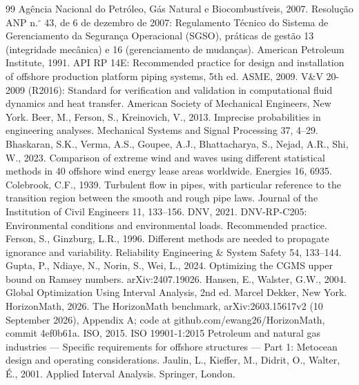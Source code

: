 \documentclass[preprint,11pt,authoryear]{elsarticle}
\begin{document}
\begin{thebibliography}{99}
 Ag\^encia Nacional do Petr\'oleo, G\'as Natural e Biocombust\'iveis, 2007. Resolu\c{c}\~ao ANP n.$^{\circ}$ 43, de 6 de dezembro de 2007: Regulamento T\'ecnico do Sistema de Gerenciamento da Seguran\c{c}a Operacional (SGSO), pr\'aticas de gest\~ao 13 (integridade mec\^anica) e 16 (gerenciamento de mudan\c{c}as).
 American Petroleum Institute, 1991. API RP 14E: Recommended practice for design and installation of offshore production platform piping systems, 5th ed.
 ASME, 2009. V\&V 20-2009 (R2016): Standard for verification and validation in computational fluid dynamics and heat transfer. American Society of Mechanical Engineers, New York.
 Beer, M., Ferson, S., Kreinovich, V., 2013. Imprecise probabilities in engineering analyses. Mechanical Systems and Signal Processing 37, 4--29.
 Bhaskaran, S.K., Verma, A.S., Goupee, A.J., Bhattacharya, S., Nejad, A.R., Shi, W., 2023. Comparison of extreme wind and waves using different statistical methods in 40 offshore wind energy lease areas worldwide. Energies 16, 6935.
 Colebrook, C.F., 1939. Turbulent flow in pipes, with particular reference to the transition region between the smooth and rough pipe laws. Journal of the Institution of Civil Engineers 11, 133--156.
 DNV, 2021. DNV-RP-C205: Environmental conditions and environmental loads. Recommended practice.
 Ferson, S., Ginzburg, L.R., 1996. Different methods are needed to propagate ignorance and variability. Reliability Engineering \& System Safety 54, 133--144.
 Gupta, P., Ndiaye, N., Norin, S., Wei, L., 2024. Optimizing the CGMS upper bound on Ramsey numbers. arXiv:2407.19026.
 Hansen, E., Walster, G.W., 2004. Global Optimization Using Interval Analysis, 2nd ed. Marcel Dekker, New York.
 HorizonMath, 2026. The HorizonMath benchmark, arXiv:2603.15617v2 (10 September 2026), Appendix A; code at github.com/ewang26/HorizonMath, commit 4ef0b61a.
 ISO, 2015. ISO 19901-1:2015 Petroleum and natural gas industries --- Specific requirements for offshore structures --- Part 1: Metocean design and operating considerations.
 Jaulin, L., Kieffer, M., Didrit, O., Walter, \'E., 2001. Applied Interval Analysis. Springer, London.

\end{thebibliography}
\end{document}
